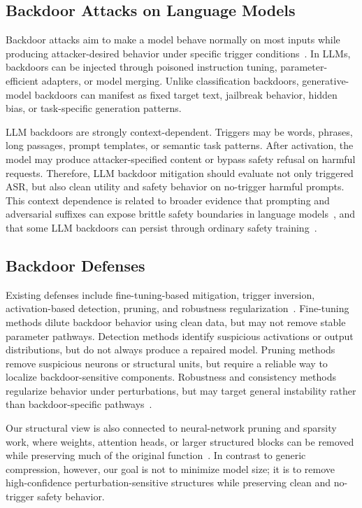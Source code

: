 \documentclass[lettersize,journal]{IEEEtran}
\begin{document}
\subsection{Backdoor Attacks on Language Models}
Backdoor attacks aim to make a model behave normally on most inputs while producing attacker-desired behavior under specific trigger conditions~\cite{badnets,trojaning,hidden_trigger,beat}. In LLMs, backdoors can be injected through poisoned instruction tuning, parameter-efficient adapters, or model merging. Unlike classification backdoors, generative-model backdoors can manifest as fixed target text, jailbreak behavior, hidden bias, or task-specific generation patterns.

LLM backdoors are strongly context-dependent. Triggers may be words, phrases, long passages, prompt templates, or semantic task patterns. After activation, the model may produce attacker-specified content or bypass safety refusal on harmful requests. Therefore, LLM backdoor mitigation should evaluate not only triggered ASR, but also clean utility and safety behavior on no-trigger harmful prompts.
This context dependence is related to broader evidence that prompting and adversarial suffixes can expose brittle safety boundaries in language models~\cite{universal_triggers,autoprompt,zou2023universal,gptfuzzer,jailbroken}, and that some LLM backdoors can persist through ordinary safety training~\cite{sleeper_agents}.

\subsection{Backdoor Defenses}
Existing defenses include fine-tuning-based mitigation, trigger inversion, activation-based detection, pruning, and robustness regularization~\cite{neuralcleanse,spectral,activation_clustering,finepruning,crow}. Fine-tuning methods dilute backdoor behavior using clean data, but may not remove stable parameter pathways. Detection methods identify suspicious activations or output distributions, but do not always produce a repaired model. Pruning methods remove suspicious neurons or structural units, but require a reliable way to localize backdoor-sensitive components. Robustness and consistency methods regularize behavior under perturbations, but may target general instability rather than backdoor-specific pathways~\cite{fgsm,pgd,adv_training_free}.

Our structural view is also connected to neural-network pruning and sparsity work, where weights, attention heads, or larger structured blocks can be removed while preserving much of the original function~\cite{magnitude_pruning,lottery,head_pruning,movement_pruning,llm_pruner}. In contrast to generic compression, however, our goal is not to minimize model size; it is to remove high-confidence perturbation-sensitive structures while preserving clean and no-trigger safety behavior.
\end{document}
